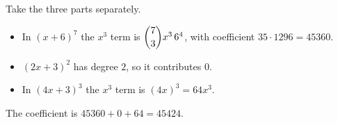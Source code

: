 Take the three parts separately.
\begin{itemize}
\item In $(x+6)^7$ the $x^3$ term is $\dbinom73x^3\,6^4$, with coefficient $35\cdot1296=45360$.
\item $(2x+3)^2$ has degree $2$, so it contributes $0$.
\item In $(4x+3)^3$ the $x^3$ term is $(4x)^3=64x^3$.
\end{itemize}
The coefficient is $45360+0+64=\boxed{45424}$.
